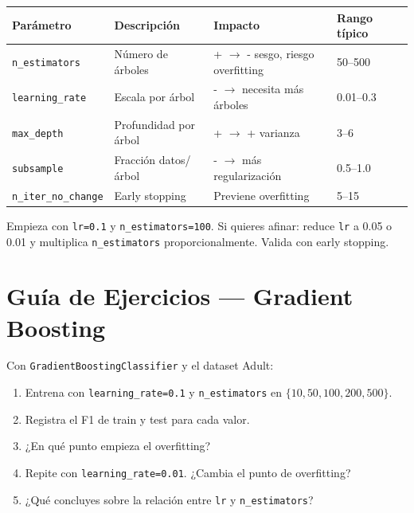 \documentclass[11pt, a4paper]{book}
\begin{document}
\begin{resumen}
  \begin{tabular}{lllll}
    \toprule
    \textbf{Parámetro} & \textbf{Descripción} & \textbf{Impacto} & \textbf{Rango típico}\\
    \midrule
    \texttt{n\_estimators} & Número de árboles & + $\to$ - sesgo, riesgo overfitting & 50--500\\
    \texttt{learning\_rate} & Escala por árbol & - $\to$ necesita más árboles & 0.01--0.3\\
    \texttt{max\_depth} & Profundidad por árbol & + $\to$ + varianza & 3--6\\
    \texttt{subsample} & Fracción datos/árbol & - $\to$ más regularización & 0.5--1.0\\
    \texttt{n\_iter\_no\_change} & Early stopping & Previene overfitting & 5--15\\
    \bottomrule
  \end{tabular}
\end{resumen}

\begin{tip}
  Empieza con \texttt{lr=0.1} y \texttt{n\_estimators=100}. Si quieres afinar:
  reduce \texttt{lr} a 0.05 o 0.01 y multiplica \texttt{n\_estimators} proporcionalmente.
  Valida con early stopping.
\end{tip}

\section{Guía de Ejercicios — Gradient Boosting}

\begin{ejercicio}
  Con \texttt{GradientBoostingClassifier} y el dataset Adult:
  \begin{enumerate}
    \item Entrena con \texttt{learning\_rate=0.1} y \texttt{n\_estimators} en $\{10, 50, 100, 200, 500\}$.
    \item Registra el F1 de train y test para cada valor.
    \item ¿En qué punto empieza el overfitting?
    \item Repite con \texttt{learning\_rate=0.01}. ¿Cambia el punto de overfitting?
    \item ¿Qué concluyes sobre la relación entre \texttt{lr} y \texttt{n\_estimators}?
  \end{enumerate}
\end{ejercicio}
\end{document}
